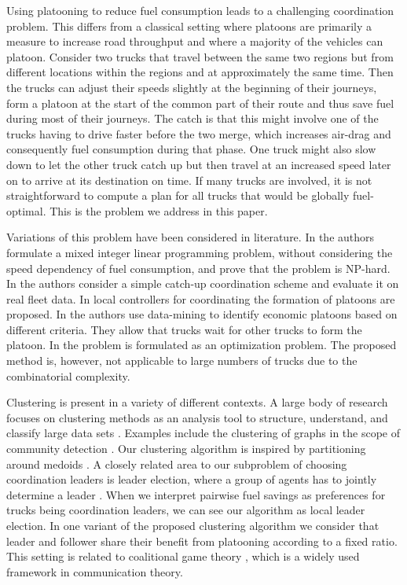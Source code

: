 \documentclass[letterpaper,10pt,conference,twocolumn]{IEEEtran}
\theoremstyle{definition}
\begin{document}
Using platooning to reduce fuel consumption leads to a challenging coordination problem. This differs from a classical setting where platoons are primarily a measure to increase road throughput and where a majority of the vehicles can platoon. Consider two trucks that travel between the same two regions but from different locations within the regions and at approximately the same time. Then the trucks can adjust their speeds slightly at the beginning of their journeys, form a platoon at the start of the common part of their route and thus save fuel during most of their journeys. The catch is that this might involve one of the trucks having to drive faster before the two merge, which increases air-drag and consequently fuel consumption during that phase. One truck might also slow down to let the other truck catch up but then travel at an increased speed later on to arrive at its destination on time. If many trucks are involved, it is not straightforward to compute a plan for all trucks that would be globally fuel-optimal. This is the problem we address in this paper.

Variations of this problem have been considered in literature. In \cite{jeff_complexity} the authors formulate a mixed integer linear programming problem, without considering the speed dependency of fuel consumption, and prove that the problem is NP-hard. In \cite{kuoyun_catchup} the authors consider a simple catch-up coordination scheme and evaluate it on real fleet data. In \cite{jeff_kuo_yun_distributed_controller} local controllers for coordinating the formation of platoons are proposed. In \cite{datamining_platooning} the authors use data-mining to identify economic platoons based on different criteria. They allow that trucks wait for other trucks to form the platoon. In \cite{ACCpaper} the problem is formulated as an optimization problem. The proposed method is, however, not applicable to large numbers of trucks due to the combinatorial complexity.

Clustering is present in a variety of different contexts. A large body of research focuses on clustering methods as an analysis tool to structure, understand, and classify large data sets \cite{clustering_book1, clustering_overview_paper}. Examples include the clustering of graphs in the scope of community detection \cite{blondelcommunity, community_detection_survey, community_detection_survey2}. Our clustering algorithm is inspired by partitioning around medoids \cite{pam_book}.
A closely related area to our subproblem of choosing coordination leaders is leader election, where a group of agents has to jointly determine a leader \cite{bully_alg, electing_good_leaders}. When we interpret pairwise fuel savings as preferences for trucks being coordination leaders, we can see our algorithm as local leader election.
In one variant of the proposed clustering algorithm we consider that leader and follower share their benefit from platooning according to a fixed ratio. This setting is related to coalitional game theory \cite{coalitional_game_theory}, which is a widely used framework in communication theory.
\end{document}
